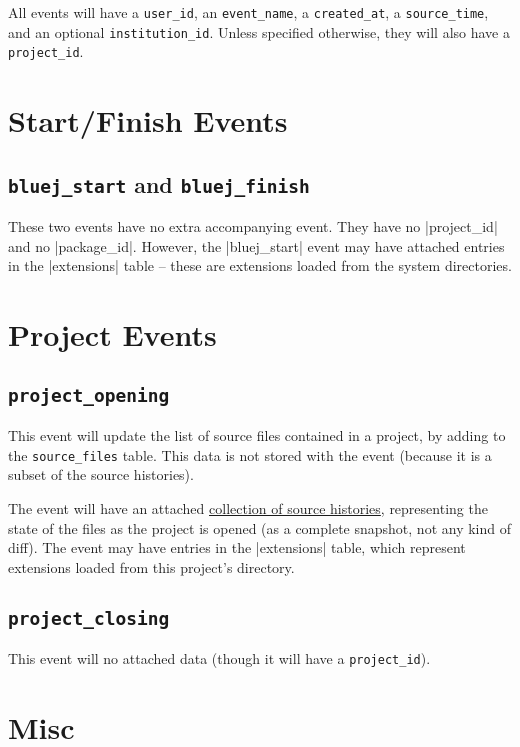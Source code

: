\documentclass{book}
\begin{document}
All events will have a \texttt{user\_id}, an \texttt{event\_name}, a
\texttt{created\_at}, a \texttt{source\_time},
and an optional
\texttt{institution\_id}.  Unless specified otherwise, they will also have a \texttt{project\_id}.

\section{Start/Finish Events}

\subsection{\lstinline|bluej_start| and \lstinline|bluej_finish|}

These two events have no extra accompanying event.  They have no
|project_id| and no |package_id|.  However, the |bluej_start| event may have
attached entries in the |extensions| table -- these are extensions loaded from
the system directories.

\section{Project Events}

\subsection{\lstinline|project_opening|}

This event will update the list of source files contained in a project, by
adding to the \texttt{source\_files} table.  This data is not stored with the
event (because it is a subset of the source histories).

The event will have an attached \hyperref[tab:source_histories]{collection of
  source histories}, representing the state of the files as the project is
opened (as a complete snapshot, not any kind of diff).  The event may have
entries in the |extensions| table, which represent extensions loaded from this
project's directory.

\subsection{\lstinline|project_closing|}

This event will no attached data (though it will have a \texttt{project\_id}).

\section{Misc}
\end{document}
